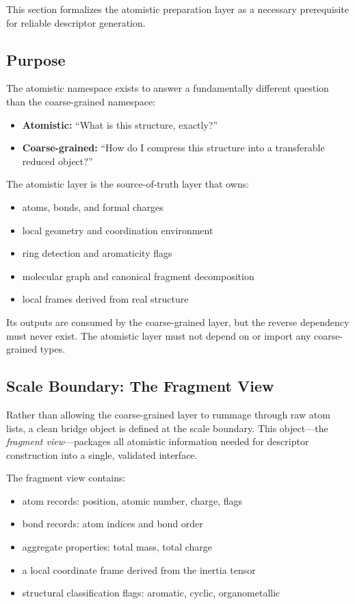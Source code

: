 \documentclass[11pt]{article}
\begin{document}
This section formalizes the atomistic preparation layer as a necessary prerequisite for reliable descriptor generation.

\subsection{Purpose}

The atomistic namespace exists to answer a fundamentally different question than the coarse-grained namespace:

\begin{itemize}
    \item \textbf{Atomistic:} ``What is this structure, exactly?''
    \item \textbf{Coarse-grained:} ``How do I compress this structure into a transferable reduced object?''
\end{itemize}

The atomistic layer is the source-of-truth layer that owns:

\begin{itemize}
    \item atoms, bonds, and formal charges
    \item local geometry and coordination environment
    \item ring detection and aromaticity flags
    \item molecular graph and canonical fragment decomposition
    \item local frames derived from real structure
\end{itemize}

Its outputs are consumed by the coarse-grained layer, but the reverse dependency must never exist. The atomistic layer must not depend on or import any coarse-grained types.

\subsection{Scale Boundary: The Fragment View}

Rather than allowing the coarse-grained layer to rummage through raw atom lists, a clean bridge object is defined at the scale boundary. This object---the \emph{fragment view}---packages all atomistic information needed for descriptor construction into a single, validated interface.

The fragment view contains:

\begin{itemize}
    \item atom records: position, atomic number, charge, flags
    \item bond records: atom indices and bond order
    \item aggregate properties: total mass, total charge
    \item a local coordinate frame derived from the inertia tensor
    \item structural classification flags: aromatic, cyclic, organometallic
\end{itemize}
\end{document}
